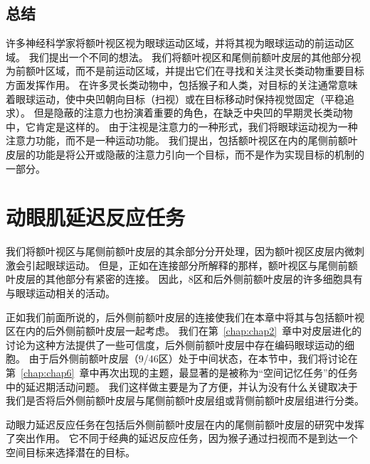 \subsection{总结}

许多神经科学家将额叶视区视为眼球运动区域，并将其视为眼球运动的前运动区域。
我们提出一个不同的想法。
我们将额叶视区和尾侧前额叶皮层的其他部分视为前额叶区域，而不是前运动区域，并提出它们在寻找和关注灵长类动物重要目标方面发挥作用。
在许多灵长类动物中，包括猴子和人类，对目标的关注通常意味着眼球运动，使中央凹朝向目标（扫视）或在目标移动时保持视觉固定（平稳追求）。
但是隐蔽的注意力也扮演着重要的角色，在缺乏中央凹的早期灵长类动物中，它肯定是这样的。
由于注视是注意力的一种形式，我们将眼球运动视为一种注意力功能，而不是一种运动功能。
我们提出，包括额叶视区在内的尾侧前额叶皮层的功能是将公开或隐蔽的注意力引向一个目标，而不是作为实现目标的机制的一部分。



\section{动眼肌延迟反应任务}

我们将额叶视区与尾侧前额叶皮层的其余部分分开处理，因为额叶视区皮层内微刺激会引起眼球运动。
但是，正如在连接部分所解释的那样，额叶视区与尾侧前额叶皮层的其他部分有紧密的连接。
因此，8区\cite{chafee1998matching}和后外侧前额叶皮层\cite{funahashi1989mnemonic}的许多细胞具有与眼球运动相关的活动。


正如我们前面所说的，后外侧前额叶皮层的连接使我们在本章中将其与包括额叶视区在内的后外侧前额叶皮层一起考虑。
我们在第~\ref{chap:chap2}~章中对皮层进化的讨论为这种方法提供了一些可信度，后外侧前额叶皮层中存在编码眼球运动的细胞。
由于后外侧前额叶皮层（9/46区）处于中间状态，在本节中，我们将讨论在第~\ref{chap:chap6}~章中再次出现的主题，最显著的是被称为“空间记忆任务”的任务中的延迟期活动问题。
我们这样做主要是为了方便，并认为没有什么关键取决于我们是否将后外侧前额叶皮层与尾侧前额叶皮层组或背侧前额叶皮层组进行分类。


动眼力延迟反应任务在包括后外侧前额叶皮层在内的尾侧前额叶皮层的研究中发挥了突出作用。
它不同于经典的延迟反应任务，因为猴子通过扫视而不是到达一个空间目标来选择潜在的目标。


